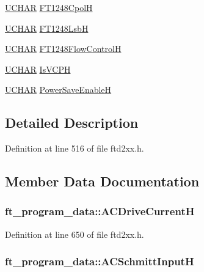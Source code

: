 \begin{DoxyCompactItemize}
\item 
\hyperlink{LALUsbx64_2include_2WinTypes_8h_a4f4bb67531a9bf6f0b9c6ad76aeba587}{UCHAR} \hyperlink{structft__program__data_a60a9e8a5d36a0e3afcb3236f82a99b1d}{FT1248CpolH}
\item 
\hyperlink{LALUsbx64_2include_2WinTypes_8h_a4f4bb67531a9bf6f0b9c6ad76aeba587}{UCHAR} \hyperlink{structft__program__data_a4088d357bd88bee7c601fa525a9175ea}{FT1248LsbH}
\item 
\hyperlink{LALUsbx64_2include_2WinTypes_8h_a4f4bb67531a9bf6f0b9c6ad76aeba587}{UCHAR} \hyperlink{structft__program__data_accb9f60cb1450ffd7d942e95729188ed}{FT1248FlowControlH}
\item 
\hyperlink{LALUsbx64_2include_2WinTypes_8h_a4f4bb67531a9bf6f0b9c6ad76aeba587}{UCHAR} \hyperlink{structft__program__data_aa92920576a9253a1ea656bb9979bdace}{IsVCPH}
\item 
\hyperlink{LALUsbx64_2include_2WinTypes_8h_a4f4bb67531a9bf6f0b9c6ad76aeba587}{UCHAR} \hyperlink{structft__program__data_a52194d4e0e5d8f880186dcdb507d966a}{PowerSaveEnableH}
\end{DoxyCompactItemize}


\subsection{Detailed Description}


Definition at line 516 of file ftd2xx.h.

\subsection{Member Data Documentation}
\hypertarget{structft__program__data_a1c70319de5ae333659097a99256e7aff}{
\subsubsection[{ACDriveCurrentH}]{ {\bf ft\_\-program\_\-data::ACDriveCurrentH}}}
\label{structft__program__data_a1c70319de5ae333659097a99256e7aff}


Definition at line 650 of file ftd2xx.h.\hypertarget{structft__program__data_a874c6759f768ab7b0a35262e80846b6b}{
\subsubsection[{ACSchmittInputH}]{ {\bf ft\_\-program\_\-data::ACSchmittInputH}}}
\label{structft__program__data_a874c6759f768ab7b0a35262e80846b6b}


